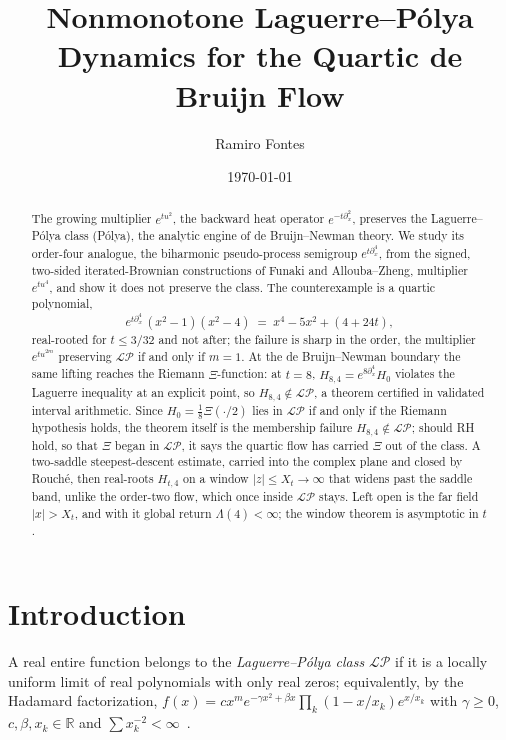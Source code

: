 \documentclass[11pt,reqno]{amsart}
\title[Nonmonotone Laguerre--P\'olya dynamics for the quartic flow]{Nonmonotone
Laguerre--P\'olya Dynamics for the Quartic de Bruijn Flow}
\author{Ramiro Fontes}
\date{\today}
\theoremstyle{plain}
\theoremstyle{definition}
\theoremstyle{remark}
\newcommand{\R}{\mathbb R}
\newcommand{\LP}{\mathcal{LP}}
\begin{document}
\begin{abstract}
The growing multiplier $e^{tu^2}$, the backward heat operator
$e^{-t\partial_x^2}$, preserves the Laguerre--P\'olya class (P\'olya), the
analytic engine of de Bruijn--Newman theory. We study its order-four analogue,
the biharmonic pseudo-process semigroup $e^{t\partial_x^4}$, from the signed,
two-sided iterated-Brownian constructions of Funaki and Allouba--Zheng, multiplier
$e^{tu^4}$, and show it does not preserve the
class. The counterexample is a quartic polynomial,
\[
   e^{t\partial_x^4}\,(x^2-1)(x^2-4)\;=\;x^4-5x^2+(4+24t),
\]
real-rooted for $t\le 3/32$ and not after; the failure is sharp in the order,
the multiplier $e^{tu^{2m}}$ preserving $\LP$ if and only if $m=1$. At the de
Bruijn--Newman boundary the same lifting reaches the Riemann $\Xi$-function: at
$t=8$, $H_{8,4}=e^{8\partial_x^4}H_0$ violates the Laguerre inequality at an
explicit point, so $H_{8,4}\notin\LP$, a theorem certified in validated
interval arithmetic. Since $H_0=\tfrac18\Xi(\cdot/2)$ lies in $\LP$ if and only if
the Riemann hypothesis holds, the theorem itself is the membership failure
$H_{8,4}\notin\LP$; should RH hold, so that $\Xi$ began in $\LP$, it says the
quartic flow has carried $\Xi$ out of the class. A two-saddle steepest-descent estimate, carried into the
complex plane and closed by Rouch\'e, then real-roots $H_{t,4}$ on a window
$|z|\le X_t\to\infty$ that widens past the saddle band, unlike the order-two flow,
which once inside $\LP$ stays. Left open is the far field $|x|>X_t$, and with it
global return $\Lambda(4)<\infty$; the window theorem is asymptotic in $t$.
\end{abstract}

\maketitle

\section{Introduction}\label{sec:intro}

A real entire function belongs to the \emph{Laguerre--P\'olya class} $\LP$ if
it is a locally uniform limit of real polynomials with only real zeros;
equivalently, by the Hadamard factorization,
$f(x)=cx^m e^{-\gamma x^2+\beta x}\prod_k(1-x/x_k)e^{x/x_k}$ with
$\gamma\ge0$, $c,\beta,x_k\in\R$ and $\sum x_k^{-2}<\infty$~\cite{Levin}.
\end{document}
